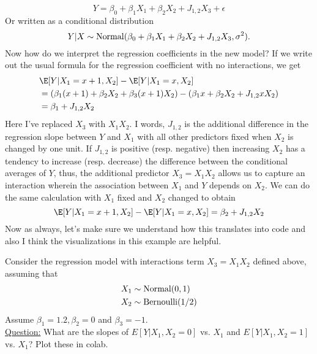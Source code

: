 \begin{equation*}
Y = \beta_0 + \beta_1 X_1 + \beta_2 X_2 + J_{1,2}X_3 + \epsilon
\end{equation*} 
Or written as a conditional distribution 
\begin{equation*}
Y|X \sim {\rm Normal}( \beta_0 + \beta_1 X_1 + \beta_2 X_2 + J_{1,2} X_3, \sigma^2). 
\end{equation*} 
 Now how do we interpret the regression coefficients in the new model? 
If we write out the usual formula for the regression coefficient with no interactions, we get 
\begin{align*}
 &\E[Y|X_1 = x+1,X_2] -\E[Y|X_1 = x,X_2]\\
 &  =  \left(\beta_1 (x+1)+ \beta_2 X_2 + \beta_3 (x+1)X_2\right)- \left(\beta_1 x + \beta_2 X_2 + J_{1,2} x X_2\right)\\
 &= \beta_1 + J_{1,2}X_2
\end{align*}
Here I've replaced $X_3$ with $X_1X_2$. I words, $J_{1,2}$ is the additional difference in the regression slope between $Y$ and $X_1$ with all other predictors fixed when $X_2$ is changed by one unit. 
If $J_{1,2}$ is positive (resp. negative) then increasing $X_2$ has a tendency to increase (resp. decrease) the difference between the conditional averages of $Y$, thus, the additional predictor $X_3 = X_1X_2$ allows us to capture an interaction wherein the association between $X_1$ and $Y$ depends on $X_2$. We can do the same calculation with $X_1$ fixed and $X_2$ changed to obtain 
\begin{equation*}
 \E[Y|X_1 = x+1,X_2] - \E[Y|X_1 = x,X_2] = \beta_2 + J_{1,2}X_2
\end{equation*}
Now as always, let's make sure we understand how this translates into code and also I think the visualizations in this example are helpful. 


\begin{example}
Consider the regression model with interactions term $X_3 = X_1X_2$ defined above, assuming that 
\begin{align*}
X_1 &\sim {\rm Normal}(0,1)\\
X_2 &\sim {\rm Bernoulli}(1/2)
\end{align*}
Assume $\beta_1 = 1.2,\beta_2 = 0$ and $\beta_3 =-1$. \\


\noindent
\underline{Question:} What are the slopes of $E[Y|X_1,X_2=0]$ vs. $X_1$ and $E[Y|X_1,X_2=1]$ vs. $X_1$? Plot these in colab. 


\end{example}

